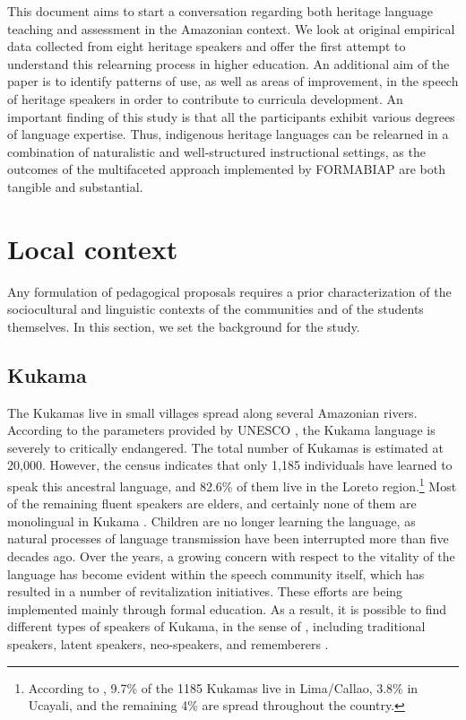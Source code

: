 \documentclass[output=paper]{langscibook}
\begin{document}
This document aims to start a conversation regarding both heritage language teaching and assessment in the Amazonian context. We look at original empirical data collected from eight heritage speakers and offer the first attempt to understand this relearning process in higher education. An additional aim of the paper is to identify patterns of use, as well as areas of improvement, in the speech of heritage speakers in order to contribute to curricula development. An important finding of this study is that all the participants exhibit various degrees of language expertise. Thus, indigenous heritage languages can be relearned in a combination of naturalistic and well-structured instructional settings, as the outcomes of the multifaceted approach implemented by FORMABIAP are both tangible and substantial.

\section{Local context}\label{sec:7:2}

Any formulation of pedagogical proposals requires a prior characterization of the sociocultural and linguistic contexts of the communities and of the students themselves. In this section, we set the background for the study.

\subsection{Kukama}

The Kukamas live in small villages spread along several Amazonian rivers. According to the parameters provided by UNESCO \citep{Moseley2010}, the Kukama language is severely to critically endangered. The total number of Kukamas is estimated at 20,000. However, the \citealt{INEI2017} census indicates that only 1,185 individuals have learned to speak this ancestral language, and 82.6\% of them live in the Loreto region.\footnote{{According to \citep{INEI2017}, 9.7\% of the 1185 Kukamas live in Lima/Callao, 3.8\% in Ucayali, and the remaining 4\% are spread throughout the country.}} Most of the remaining fluent speakers are elders, and certainly none of them are monolingual in Kukama \citep{Vallejos2016b}. Children are no longer learning the language, as natural processes of language transmission have been interrupted more than five decades ago. Over the years, a growing concern with respect to the vitality of the language has become evident within the speech community itself, which has resulted in a number of revitalization initiatives. These efforts are being implemented mainly through formal education. As a result, it is possible to find different types of speakers of Kukama, in the sense of \citet{GrinevaldBert2011}, including traditional speakers, latent speakers, neo-speakers, and rememberers \citep{Vallejos2016b}.
\end{document}
